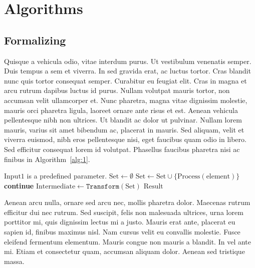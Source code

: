 \section{Algorithms}

\subsection{Formalizing}
Quisque a vehicula odio, vitae interdum purus. Ut vestibulum venenatis semper. Duis tempus a sem et viverra. In sed gravida erat, ac luctus tortor. Cras blandit nunc quis tortor consequat semper. Curabitur eu feugiat elit. Cras in magna et arcu rutrum dapibus luctus id purus. Nullam volutpat mauris tortor, non accumsan velit ullamcorper et. Nunc pharetra, magna vitae dignissim molestie, mauris orci pharetra ligula, laoreet ornare ante risus et est. Aenean vehicula pellentesque nibh non ultrices. Ut blandit ac dolor ut pulvinar. Nullam lorem mauris, varius sit amet bibendum ac, placerat in mauris. Sed aliquam, velit et viverra euismod, nibh eros pellentesque nisi, eget faucibus quam odio in libero. Sed efficitur consequat lorem id volutpat. Phasellus faucibus pharetra nisi ac finibus in Algorithm~\ref{alg:1}.

\begin{algorithm}[H]
	\small
	\caption{$(\text{Result}) \gets \texttt{Sample}(\text{Input1})$}
	\label{alg:1}
	\begin{algorithmic}[1]
		\Require $\text{Input1}$ is a predefined parameter.
		\State $\text{Set} \gets \emptyset$
		\State $\text{Set} \gets \text{Set} \cup \{\text{Process}(\text{element})\}$
		\Else
		\State \textbf{continue}
		\EndIf
		\EndFor
		\State $\text{Intermediate} \gets \texttt{Transform}(\text{Set})$
		\State \Return $\text{Result}$
	\end{algorithmic}
\end{algorithm}

Aenean arcu nulla, ornare sed arcu nec, mollis pharetra dolor. Maecenas rutrum efficitur dui nec rutrum. Sed suscipit, felis non malesuada ultrices, urna lorem porttitor mi, quis dignissim lectus mi a justo. Mauris erat ante, placerat eu sapien id, finibus maximus nisl. Nam cursus velit eu convallis molestie. Fusce eleifend fermentum elementum. Mauris congue non mauris a blandit. In vel ante mi. Etiam et consectetur quam, accumsan aliquam dolor. Aenean sed tristique massa.